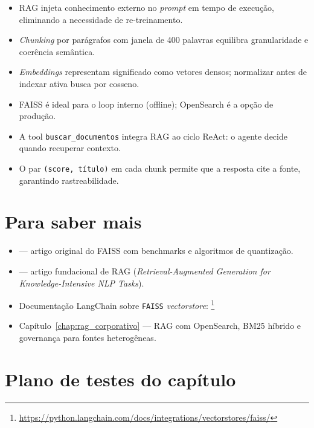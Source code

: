 \begin{itemize}[leftmargin=*]
  \item RAG injeta conhecimento externo no \textit{prompt} em tempo
        de execu\c{c}\~ao, eliminando a necessidade de re-treinamento.
  \item \textit{Chunking} por par\'agrafos com janela de 400 palavras
        equilibra granularidade e coer\^encia sem\^antica.
  \item \textit{Embeddings} representam significado como vetores
        densos; normalizar antes de indexar ativa busca por cosseno.
  \item FAISS \'e ideal para o loop interno (offline); OpenSearch
        \'e a op\c{c}\~ao de produ\c{c}\~ao.
  \item A tool \texttt{buscar\_documentos} integra RAG ao ciclo
        ReAct: o agente decide quando recuperar contexto.
  \item O par \texttt{(score, t\'itulo)} em cada chunk permite que
        a resposta cite a fonte, garantindo rastreabilidade.
\end{itemize}

\section{Para saber mais}

\begin{itemize}[leftmargin=*]
  \item {} --- artigo original do FAISS com
        benchmarks e algoritmos de quantiza\c{c}\~ao.
  \item {} --- artigo fundacional de RAG
        (\textit{Retrieval-Augmented Generation for Knowledge-Intensive NLP Tasks}).
  \item Documenta\c{c}\~ao LangChain sobre \texttt{FAISS}
        \textit{vectorstore}:
        \footnote{\url{https://python.langchain.com/docs/integrations/vectorstores/faiss/}}
  \item Cap\'itulo~\ref{chap:rag_corporativo} --- RAG com OpenSearch,
        BM25 h\'ibrido e governan\c{c}a para fontes heterog\^eneas.
\end{itemize}

\section{Plano de testes do cap\'itulo}

